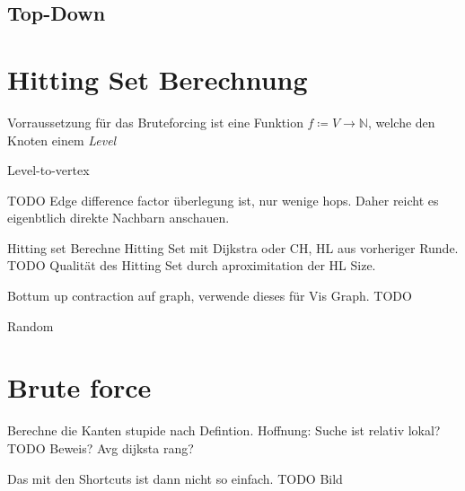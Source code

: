 \subsection{Top-Down}



\section{Hitting Set Berechnung}
Vorraussetzung für das Bruteforcing ist eine Funktion $f \coloneq V \to \mathbb{N}$, welche den Knoten einem \emph{Level}

Level-to-vertex

TODO Edge difference factor
überlegung ist, nur wenige hops. Daher reicht es eigenbtlich direkte Nachbarn anschauen.

Hitting set
Berechne Hitting Set mit Dijkstra oder CH, HL aus vorheriger Runde.
TODO Qualität des Hitting Set durch aproximitation der HL Size.

Bottum up contraction auf graph, verwende dieses für Vis Graph.
TODO

Random


\section{Brute force}

Berechne die Kanten stupide nach Defintion. Hoffnung: Suche ist relativ lokal? TODO Beweis? Avg dijksta rang?

Das mit den Shortcuts ist dann nicht so einfach. TODO Bild

